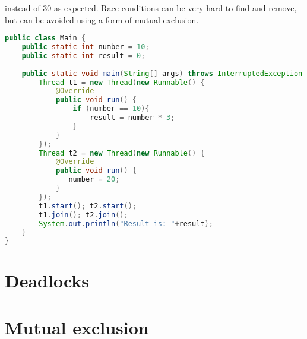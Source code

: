 instead of 30 as expected. Race conditions can be very hard to find and remove, but can be avoided using a form of mutual exclusion.
\begin{lstlisting}[float,label=lst:racecondition,
  caption={Race condition example},
  language=Java,  
  showspaces=false,
  showtabs=false,
  breaklines=true,
  showstringspaces=false,
  breakatwhitespace=true,
  commentstyle=\color{greencomments},
  keywordstyle=\color{bluekeywords},
  stringstyle=\color{redstrings}]  % Start your code-block
public class Main {
    public static int number = 10;
    public static int result = 0;
    
    public static void main(String[] args) throws InterruptedException {
        Thread t1 = new Thread(new Runnable() {
            @Override
            public void run() {
                if (number == 10){
                    result = number * 3;
                }
            }
        });
        Thread t2 = new Thread(new Runnable() {
            @Override
            public void run() {
               number = 20;
            }
        });
        t1.start(); t2.start();
        t1.join(); t2.join();
        System.out.println("Result is: "+result);
    }
}
\end{lstlisting}

 
\section{Deadlocks}
\section{Mutual exclusion}
 
\worksheetend
